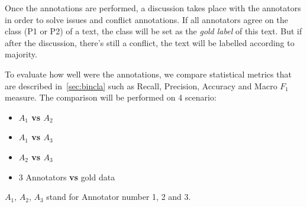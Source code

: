 Once the annotations are performed, a discussion takes place with the annotators in order to solve issues and conflict annotations. If all annotators agree on the class (P1 or P2) of a text, the class will be set as the \emph{gold label} of this text. But if after the discussion, there's still a conflict, the text will be labelled according to majority. 

To evaluate how well were the annotations, we compare statistical metrics that are described in~\cref{sec:bincla} such as Recall, Precision, Accuracy and Macro $F_{1}$ measure. The comparison will be performed on 4 scenario: 
\begin{itemize}
  \item \textbf{$A_1$ vs $A_2$}
  \item \textbf{$A_1$ vs $A_3$}
  \item \textbf{$A_2$ vs $A_3$}
  \item 3 Annotators \textbf{vs} \Gls{gold data}
\end{itemize}
$A_1$, $A_2$, $A_3$ stand for Annotator number 1, 2 and 3. 

